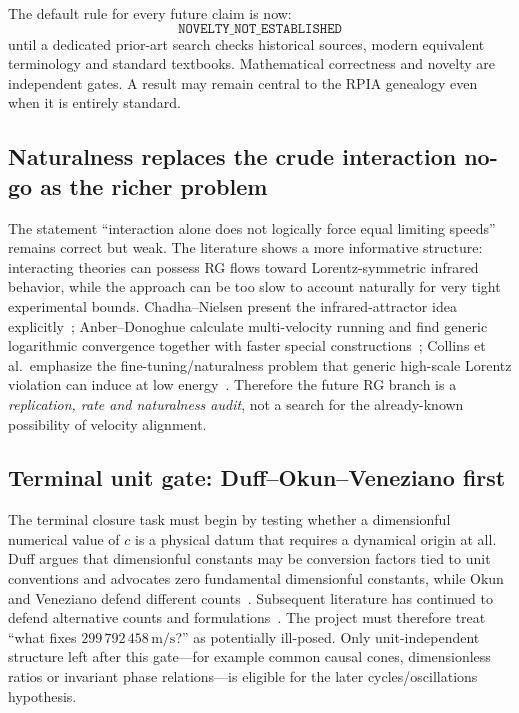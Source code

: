 \documentclass[11pt,a4paper]{article}
\begin{document}
The default rule for every future claim is now:
\begin{equation}
\boxed{\texttt{NOVELTY\_NOT\_ESTABLISHED}}
\end{equation}
until a dedicated prior-art search checks historical sources, modern equivalent terminology and standard textbooks.  Mathematical correctness and novelty are independent gates.  A result may remain central to the RPIA genealogy even when it is entirely standard.

\subsection{Naturalness replaces the crude interaction no-go as the richer problem}
The statement ``interaction alone does not logically force equal limiting speeds'' remains correct but weak.  The literature shows a more informative structure: interacting theories can possess RG flows toward Lorentz-symmetric infrared behavior, while the approach can be too slow to account naturally for very tight experimental bounds.  Chadha--Nielsen present the infrared-attractor idea explicitly~\cite{chadha1983}; Anber--Donoghue calculate multi-velocity running and find generic logarithmic convergence together with faster special constructions~\cite{anber2011}; Collins et al.\ emphasize the fine-tuning/naturalness problem that generic high-scale Lorentz violation can induce at low energy~\cite{collins2004}.  Therefore the future RG branch is a \emph{replication, rate and naturalness audit}, not a search for the already-known possibility of velocity alignment.

\subsection{Terminal unit gate: Duff--Okun--Veneziano first}
The terminal closure task must begin by testing whether a dimensionful numerical value of $c$ is a physical datum that requires a dynamical origin at all.  Duff argues that dimensionful constants may be conversion factors tied to unit conventions and advocates zero fundamental dimensionful constants, while Okun and Veneziano defend different counts~\cite{duff2002}.  Subsequent literature has continued to defend alternative counts and formulations~\cite{matsas2007,matsas2023}.  The project must therefore treat ``what fixes $299\,792\,458\,\mathrm{m/s}$?'' as potentially ill-posed.  Only unit-independent structure left after this gate---for example common causal cones, dimensionless ratios or invariant phase relations---is eligible for the later cycles/oscillations hypothesis.
\end{document}
